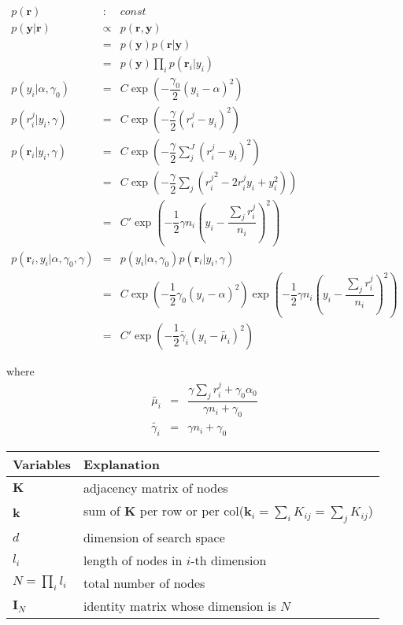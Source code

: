 \documentclass[platex, a4paper]{jsarticle}
\begin{document}
\begin{eqnarray}
  p(\bm{r}) &:& const \\
  p\left( \bm{y} |\bm{r}\right) &\propto&  p\left( \bm{r} ,\bm{y}\right) \\
    &=& p\left( \bm{y} \right) p\left( \bm{r} |\bm{y}\right) \\
    &=& p\left( \bm{y} \right) \prod_i p\left( \bm{r}_i |y_i \right) \\
  p\left( y_{i} | \alpha, \gamma_0 \right)
    &=& C\exp \left( -\dfrac {\gamma_0} {2} \left( y_{i}-\alpha \right) ^{2}\right) \\
  p(r_{i}^{j} | y_{i}, \gamma)
    &=& C\exp \left( -\dfrac {\gamma} {2} \left( r_{i}^{j}-y_{i}\right) ^{2}\right) \\
  p\left( \bm{r}_i | y_i, \gamma \right)
    &=& C\exp \left( -\dfrac {\gamma} {2}\sum_{j}^J \left( r_{i}^{j}-y_{i}\right) ^{2}\right) \\
    &=& C\exp \left( -\dfrac {\gamma} {2}\sum_{j}\left( {r_{i}^{j}}^2-2r_{i}^{j}y_{i}+y_{i}^{2}\right) \right) \\
    &=& C'\exp \left( -\dfrac {1} {2}\gamma n_{i}\left( y_{i}-\dfrac {\sum _{j}r_{i}^{j}} {n_{i}}\right) ^{2}\right) \\
  p\left( \bm{r}_i ,y_i | \alpha, \gamma_0, \gamma \right) &=& p\left( y_i | \alpha, \gamma_0 \right) p\left( \bm{r}_i | y_i, \gamma \right) \\
    &=& C\exp \left( -\dfrac {1} {2} \gamma_0 \left( y_{i}-\alpha \right) ^{2}\right)
    \exp \left( -\dfrac {1} {2}\gamma n_{i}\left( y_{i}-\dfrac {\sum _{j}r_{i}^{j}} {n_{i}}\right) ^{2}\right) \\
    &=& C'\exp \left( - \dfrac {1} {2} \tilde{\gamma_i} \left( y_{i} - \tilde {\mu_i} \right) ^{2}  \right)
\end{eqnarray}

where
\begin{eqnarray}
  \tilde{\mu_i} &=& \dfrac {\gamma \sum _{j}r_{i}^{j}+\gamma_0\alpha _{0}} {\gamma n_{i}+\gamma _{0}} \\
  \tilde{\gamma_i} &=& \gamma n_{i}+\gamma _{0}
\end{eqnarray}

\begin{table}[htb]
\begin{tabular}{ll} \toprule
Variables & Explanation \\ \toprule
$\bm{K}$ & adjacency matrix of nodes\\
$\bm{k}$ & sum of $\bm{K}$ per row or per col($\bm{k}_{i}= \sum_i K_{ij} = \sum_j K_{ij}$)\\
$d$ & dimension of search space \\
$l_i$ & length of nodes in $i$-th dimension \\
$N=\prod_i l_i$ & total number of nodes \\
$\bm{I}_N$ & identity matrix whose dimension is $N$\\
\bottomrule
\end{tabular}
\end{table}
\end{document}
